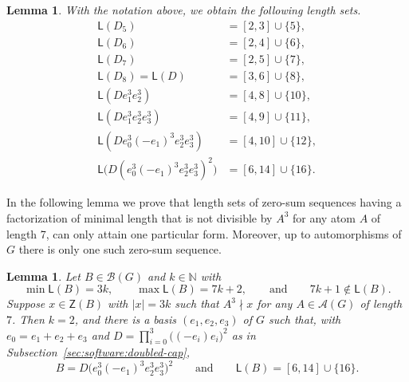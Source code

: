 \documentclass[a4paper, 10pt]{amsart}
\theoremstyle{plain}
\newtheorem{lemma}[theorem]{\bf Lemma}
\theoremstyle{definition}
\theoremstyle{definition}
\newcommand{\N}{\mathbb N}
\numberwithin{equation}{section}
\begin{document}
\begin{lemma} \label{lem:comp:doubled-cap-seeds}
With the notation above, we obtain the following length sets.
\begin{align*}
 \mathsf L(D_5)&=[2,3]\cup\{5\},\\
 \mathsf L(D_6)&=[2,4]\cup\{6\},\\
 \mathsf L(D_7)&=[2,5]\cup\{7\},\\
 \mathsf L(D_8)=\mathsf L(D)&=[3,6]\cup\{8\},\\
 \mathsf L(D e_1^3e_2^3)&=[4,8]\cup\{10\},\\
 \mathsf L(D e_1^3e_2^3e_3^3)&=[4,9]\cup\{11\},\\
 \mathsf L(D e_0^3(-e_1)^3e_2^3e_3^3)&=[4,10]\cup\{12\},\\
 \mathsf L\bigl(D (e_0^3(-e_1)^3e_2^3e_3^3)^2\bigr)
   &=[6,14]\cup\{16\}.
\end{align*}
\end{lemma}

\smallskip
In the following lemma we prove that length sets of zero-sum sequences having a factorization of minimal length
that is not divisible by $A^3$ for any atom $A$ of length 7,
can only attain one particular form. Moreover,  up to automorphisms of $G$
there is only one such zero-sum sequence.

\begin{lemma} \label{lem:comp:doubled-cap-cubes}
Let $B \in \mathcal B (G)$ and  $k \in \N$  with
\[
 \min \mathsf L (B) = 3k,
 \qquad
 \max \mathsf L (B) = 7k+2,
 \qquad \text{and} \qquad
 7k+1 \notin \mathsf L (B) .
\]
Suppose $x \in \mathsf Z (B)$ with $|x| = 3k$ such that $A^3\nmid x$ for any $A\in \mathcal A(G)$ of length $7$.  Then $k=2$, and there is a basis
$(e_1,e_2,e_3)$ of $G$ such that, with $e_0=e_1+e_2+e_3$ and
$D=\prod_{i=0}^{3}\bigl((-e_i)e_i\bigr)^2$ as in
Subsection~\ref{sec:software:doubled-cap},
\[
 B = D\bigl(e_0^3(-e_1)^3e_2^3e_3^3\bigr)^2 
 \qquad \text{and} \qquad
 \mathsf L (B) = [6,14]\cup\{16\} .
\]
\end{lemma}
\end{document}
